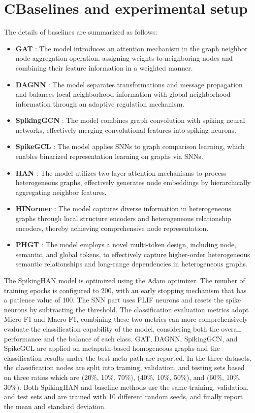\documentclass[letterpaper]{article} %
\begin{document}
\section{C\hspace{1em}Baselines and experimental setup}
The details of baselines are summarized as follows:
\begin{itemize}
    \item \textbf{GAT} \cite{bib36}: The model introduces an attention mechanism in the graph neighbor node aggregation operation, assigning weights to neighboring nodes and combining their feature information in a weighted manner.
    \item \textbf{DAGNN} \cite{bib37}: The model separates transformations and message propagation and balances local neighborhood information with global neighborhood information through an adaptive regulation mechanism.
    \item \textbf{SpikingGCN} \cite{bib15}: The model combines graph convolution with spiking neural networks, effectively merging convolutional features into spiking neurons.
    \item \textbf{SpikeGCL} \cite{bib16}: The model applies SNNs to graph comparison learning, which enables binarized representation learning on graphs via SNNs.
    \item \textbf{HAN} \cite{bib10}: The model utilizes two-layer attention mechanisms to process heterogeneous graphs, effectively generates node embeddings by hierarchically aggregating neighbor features.
    \item \textbf{HINormer} \cite{bib38}: The model captures diverse information in heterogeneous graphs through local structure encoders and heterogeneous relationship encoders, thereby achieving comprehensive node representation.
    \item \textbf{PHGT} \cite{bib21}: The model employs a novel multi-token design, including node, semantic, and global tokens, to effectively capture higher-order heterogeneous semantic relationships and long-range dependencies in heterogeneous graphs.
\end{itemize}

The SpikingHAN model is optimized using the Adam optimizer. The number of training epochs is configured to 200, with an early stopping mechanism that has a patience value of 100. The SNN part uses PLIF neurons and resets the spike neurons by subtracting the threshold. The classification evaluation metrics adopt Micro-F1 and Macro-F1, combining these two metrics can more comprehensively evaluate the classification capability of the model, considering both the overall performance and the balance of each class. GAT, DAGNN, SpikingGCN, and SpikeGCL are applied on metapath-based homogeneous graphs and the classification results under the best meta-path are reported. In the three datasets, the classification nodes are split into training, validation, and testing sets based on three ratios which are (20\%, 10\%, 70\%), (40\%, 10\%, 50\%), and (60\%, 10\%, 30\%). Both SpikingHAN and baseline methods use the same training, validation, and test sets and are trained with 10 different random seeds, and finally report the mean and standard deviation.
\end{document}
